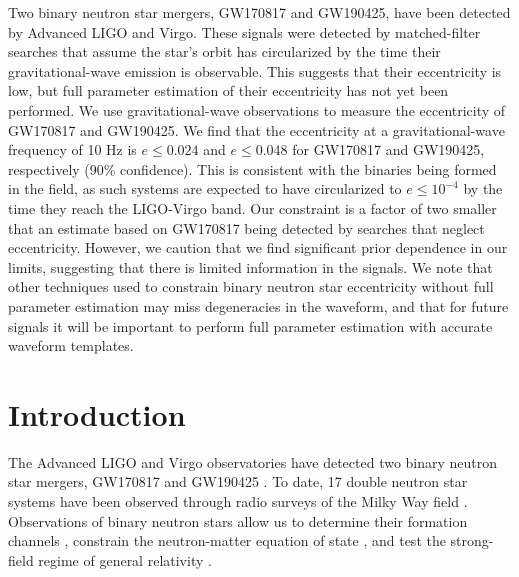 Two binary neutron star mergers, GW170817 and GW190425, have been detected by Advanced LIGO and Virgo. These signals were detected by matched-filter searches that assume the star's orbit has circularized by the time their gravitational-wave emission is observable. This suggests that their eccentricity is low, but full parameter estimation of their eccentricity has not yet been performed. We use gravitational-wave observations to measure the eccentricity of GW170817 and GW190425. We find that the eccentricity at a gravitational-wave frequency of 10 Hz is  $e \leq 0.024$ and $e \leq 0.048$ for GW170817 and GW190425, respectively (90\% confidence). This is consistent with the binaries being formed in the field, as such systems are expected to have circularized to $e \leq 10^{-4}$ by the time they reach the LIGO-Virgo band. Our constraint is a factor of two smaller that an estimate based on GW170817 being detected by searches that neglect eccentricity. However, we caution that we find significant prior dependence in our limits, suggesting that there is limited information in the signals. We note that other techniques used to constrain binary neutron star eccentricity without full parameter estimation may miss degeneracies in the waveform, and that for future signals it will be important to perform full parameter estimation with accurate waveform templates.

\section{Introduction}
\label{sec:pe-intro}
The Advanced LIGO and Virgo observatories have detected two binary neutron star mergers, GW170817 \cite{TheLIGOScientific:2017qsa} and GW190425 \cite{Abbott:2020uma}. To date, 17 double neutron star systems have been observed through radio surveys of the Milky Way field \cite{Martinez:2017jbp,Tauris:2017omb,Cameron:2017ody,Stovall:2018ouw,Lynch:2018zxo}. Observations of binary neutron stars allow us to determine their formation channels \cite{Smarr1976,Canal:1990dz,PortegiesZwart1:1997zn,Postnov:2006hka,Kalogera:2006uj,Kowalska:2010qg,Tauris:2017omb,Belczynski:2018ptv,Vigna-Gomez:2018dza,Giacobbo:2018etu,Mapelli:2018wys,Andrews:2019vou}, constrain the neutron-matter equation of state \cite{Bauswein:2017vtn,Annala:2017llu,Fattoyev:2017jql,De:2018uhw,Abbott:2018exr,Capano:2019eae,Tews:2018iwm,Most:2018hfd,Radice:2018ozg,Coughlin:2018fis,Forbes:2019xaz}, and test the strong-field regime of general relativity \cite{Abbott:2018lct}.

